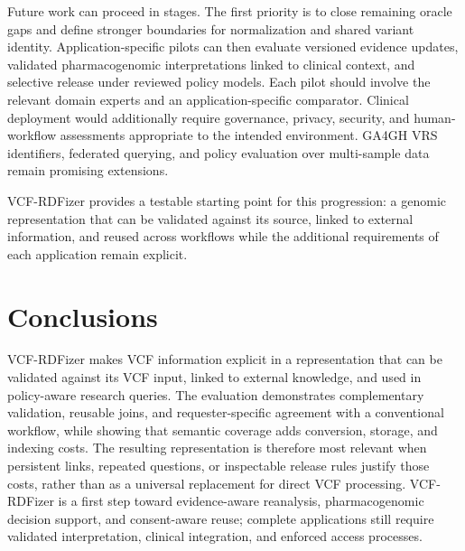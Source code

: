 \documentclass[pdflatex,sn-mathphys-num]{sn-jnl}
\begin{document}
Future work can proceed in stages.
The first priority is to close remaining oracle gaps and define stronger boundaries for normalization and shared variant identity.
Application-specific pilots can then evaluate versioned evidence updates, validated pharmacogenomic interpretations linked to clinical context, and selective release under reviewed policy models.
Each pilot should involve the relevant domain experts and an application-specific comparator.
Clinical deployment would additionally require governance, privacy, security, and human-workflow assessments appropriate to the intended environment.
GA4GH VRS identifiers, federated querying, and policy evaluation over multi-sample data remain promising extensions.

VCF-RDFizer provides a testable starting point for this progression: a genomic representation that can be validated against its source, linked to external information, and reused across workflows while the additional requirements of each application remain explicit.

\section{Conclusions}\label{sec:conclusions}
VCF-RDFizer makes VCF information explicit in a representation that can be validated against its VCF input, linked to external knowledge, and used in policy-aware research queries.
The evaluation demonstrates complementary validation, reusable joins, and requester-specific agreement with a conventional workflow, while showing that semantic coverage adds conversion, storage, and indexing costs.
The resulting representation is therefore most relevant when persistent links, repeated questions, or inspectable release rules justify those costs, rather than as a universal replacement for direct VCF processing.
VCF-RDFizer is a first step toward evidence-aware reanalysis, pharmacogenomic decision support, and consent-aware reuse; complete applications still require validated interpretation, clinical integration, and enforced access processes.
\end{document}
